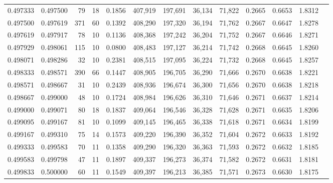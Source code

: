 \begin{tabular}{rrrrrrrrrrrrr}
0.497333 & 0.497500 &    79 &  18 &                                     0.1856 & 407,919 & 197,691 &  36,134 &  71,822 & 0.2665 & 0.6653 & 1.8312 \\
0.497500 & 0.497619 &   371 &  60 &                                     0.1392 & 408,290 & 197,320 &  36,194 &  71,762 & 0.2667 & 0.6647 & 1.8278 \\
0.497619 & 0.497917 &    78 &  10 &                                     0.1136 & 408,368 & 197,242 &  36,204 &  71,752 & 0.2667 & 0.6646 & 1.8271 \\
0.497929 & 0.498061 &   115 &  10 &                                     0.0800 & 408,483 & 197,127 &  36,214 &  71,742 & 0.2668 & 0.6645 & 1.8260 \\
0.498071 & 0.498286 &    32 &  10 &                                     0.2381 & 408,515 & 197,095 &  36,224 &  71,732 & 0.2668 & 0.6645 & 1.8257 \\
0.498333 & 0.498571 &   390 &  66 &                                     0.1447 & 408,905 & 196,705 &  36,290 &  71,666 & 0.2670 & 0.6638 & 1.8221 \\
0.498571 & 0.498667 &    31 &  10 &                                     0.2439 & 408,936 & 196,674 &  36,300 &  71,656 & 0.2670 & 0.6638 & 1.8218 \\
0.498667 & 0.499000 &    48 &  10 &                                     0.1724 & 408,984 & 196,626 &  36,310 &  71,646 & 0.2671 & 0.6637 & 1.8214 \\
0.499000 & 0.499071 &    80 &  18 &                                     0.1837 & 409,064 & 196,546 &  36,328 &  71,628 & 0.2671 & 0.6635 & 1.8206 \\
0.499095 & 0.499167 &    81 &  10 &                                     0.1099 & 409,145 & 196,465 &  36,338 &  71,618 & 0.2671 & 0.6634 & 1.8199 \\
0.499167 & 0.499310 &    75 &  14 &                                     0.1573 & 409,220 & 196,390 &  36,352 &  71,604 & 0.2672 & 0.6633 & 1.8192 \\
0.499333 & 0.499583 &    70 &  11 &                                     0.1358 & 409,290 & 196,320 &  36,363 &  71,593 & 0.2672 & 0.6632 & 1.8185 \\
0.499583 & 0.499798 &    47 &  11 &                                     0.1897 & 409,337 & 196,273 &  36,374 &  71,582 & 0.2672 & 0.6631 & 1.8181 \\
0.499833 & 0.500000 &    60 &  11 &                                     0.1549 & 409,397 & 196,213 &  36,385 &  71,571 & 0.2673 & 0.6630 & 1.8175 \\

\end{tabular}
